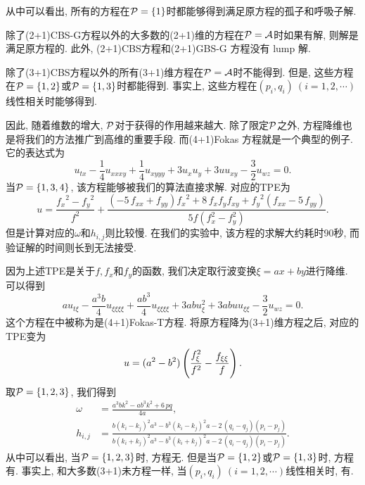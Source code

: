 从中可以看出, 所有的方程在$\mathcal{P}=\{1\}$时都能够得到满足原方程的孤子和呼吸子解. 

除了(2+1)CBS-G方程以外的大多数的(2+1)维的方程在$\mathcal{P}= \mathcal{A}$时如果有解, 则解是满足原方程的. 此外, (2+1)CBS方程和(2+1)GBS-G 方程没有 lump 解. 

除了(3+1)CBS方程以外的所有(3+1)维方程在$\mathcal{P}= \mathcal{A}$时不能得到\TrueSol{}. 但是, 这些方程在$\mathcal{P}=\{1,2\}$或$\mathcal{P}=\{1,3\}$时都能得到\TrueSol{}. 事实上, 这些方程在$(p_i,q_i)~(i=1,2,\cdots)$线性相关时能够得到\TrueSol{}.

因此, 随着维数的增大, $\mathcal{P}$对于获得\TrueSol{}的作用越来越大. 除了限定$\mathcal{P}$之外, 方程降维也是将我们的方法推广到高维的重要手段. 而(4+1)Fokas 方程\CITEdaFokas{}就是一个典型的例子. 它的表达式为
\begin{equation}
    u_{tx}-\frac{1}{4}u_{xxxy}+\frac{1}{4}u_{xyyy}+3u_xu_y+3uu_{xy}-\frac{3}{2}u_{wz}=0. \label{Fokas}
\end{equation}
当$\mathcal{P}=\{1,3,4\}$, 该方程能够被我们的算法直接求解. 对应的TPE为
\begin{equation}
u={\frac {{f_{{x}}}^{2}-{f_{{y}}}^{2}}{{f}^{2}}}+{\frac { \left( -5\,f_{
{{ xx}}}+f_{{{ yy}}} \right) {f_{{x}}}^{2}+8\,f_{{x}}f_{{y}}f_{{
{ xy}}}+{f_{{y}}}^{2} \left( f_{{{ xx}}}-5\,f_{{{ yy}}}
\right) }{5f(f_x^2-f_y^2)}}.
\end{equation}
但是计算对应的$\omega$和$h_{i,j}$则比较慢. 在我们的实验中, 该方程的求解大约耗时90秒, 而验证解的时间则长到无法接受. 

因为上述TPE是关于$f,f_x$和$f_y$的函数, 我们决定取行波变换$\xi=ax+by$进行降维. 可以得到
\begin{equation}
    au_{t\xi}-\frac{a^3b}{4}u_{\xi\xi\xi\xi}+\frac{ab^3}{4}u_{\xi\xi\xi\xi}+3abu_{\xi}^2+3abuu_{\xi\xi}-\frac{3}{2}u_{wz}=0.  \label{Fokas-T}
\end{equation}
这个方程在中被称为是(4+1)Fokas-T方程. 将原方程降为(3+1)维方程之后, 对应的TPE变为
\begin{equation}
    u=(a^2-b^2)\left(\frac{f_{\xi}^2}{f^2}-\frac{f_{\xi\xi}}{f}\right).
\end{equation}
取$\mathcal{P}=\{1,2,3\}$, 我们得到
\begin{equation}
\begin{split}
    \omega&={\frac {{a}^{3}b{k}^{2}-a{b}^{3}{k}^{2}+6\,pq}{4a}}, \\
    h_{{i,j}}&={\frac {b \left( k_{{i}}-k_{{j}} \right) ^{2}{a}^{3}-{b}^{3}
    \left( k_{{i}}-k_{{j}} \right) ^{2}a-2\, \left( q_{{i}}-q_{{j}}
    \right)  \left( p_{{i}}-p_{{j}} \right) }{b \left( k_{{i}}+k_{{j}}
    \right) ^{2}{a}^{3}-{b}^{3} \left( k_{{i}}+k_{{j}} \right) ^{2}a-2\,
    \left( q_{{i}}-q_{{j}} \right)  \left( p_{{i}}-p_{{j}} \right) }}.
\end{split}
\end{equation}
从中可以看出, 当$\mathcal{P}=\{1,2,3\}$时, 方程无\TrueSol{}. 但是当$\mathcal{P}=\{1,2\}$或$\mathcal{P}=\{1,3\}$时, 方程有\TrueSol{}. 事实上, 和大多数(3+1)未方程一样, 当$(p_i,q_i)~(i=1,2,\cdots)$线性相关时, 有\TrueSol{}.

